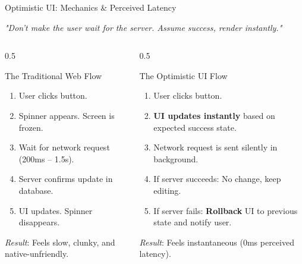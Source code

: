 \documentclass[aspectratio=169, 10pt]{beamer}
\begin{document}
\begin{frame}{Optimistic UI: Mechanics \& Perceived Latency}
  \begin{center}
    \textit{"Don't make the user wait for the server. Assume success, render instantly."}
  \end{center}
  \vspace{0.5em}
  \begin{columns}
    \begin{column}{0.5\textwidth}
      \begin{block}{The Traditional Web Flow}
        \begin{enumerate}
          \item User clicks button.
          \item Spinner appears. Screen is frozen.
          \item Wait for network request (200ms -- 1.5s).
          \item Server confirms update in database.
          \item UI updates. Spinner disappears.
        \end{enumerate}
        \textit{Result}: Feels slow, clunky, and native-unfriendly.
      \end{block}
    \end{column}
    \begin{column}{0.5\textwidth}
      \begin{block}{The Optimistic UI Flow}
        \begin{enumerate}
          \item User clicks button.
          \item \textbf{UI updates instantly} based on expected success state.
          \item Network request is sent silently in background.
          \item If server succeeds: No change, keep editing.
          \item If server fails: \textbf{Rollback} UI to previous state and notify user.
        \end{enumerate}
        \textit{Result}: Feels instantaneous (0ms perceived latency).
      \end{block}
    \end{column}
  \end{columns}
\end{frame}
\end{document}
